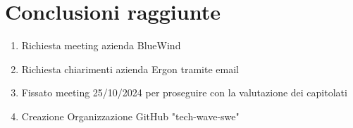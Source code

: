 \documentclass{TWReport}
\begin{document}
\section*{Conclusioni raggiunte}
\begin{enumerate}
    \item Richiesta meeting azienda BlueWind
    \item Richiesta chiarimenti azienda Ergon tramite email
    \item Fissato meeting 25/10/2024 per proseguire con la valutazione dei capitolati
    \item Creazione Organizzazione GitHub "tech-wave-swe"

\end{enumerate}
\end{document}
